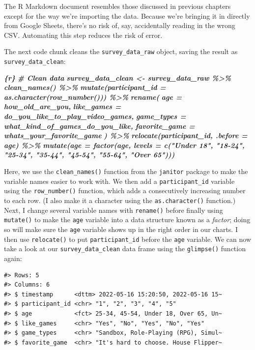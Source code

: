 \documentclass[
]{book}
\newenvironment{Shaded}{\begin{snugshade}}{\end{snugshade}}
\newcommand{\InformationTok}[1]{\textcolor[rgb]{0.56,0.35,0.01}{\textbf{\textit{#1}}}}
\begin{document}
The R Markdown document resembles those discussed in previous chapters except for the way we're importing the data. Because we're bringing it in directly from Google Sheets, there's no risk of, say, accidentally reading in the wrong CSV. Automating this step reduces the risk of error.

The next code chunk cleans the \texttt{survey\_data\_raw} object, saving the result as \texttt{survey\_data\_clean}:

\begin{Shaded}
\begin{Highlighting}[]
\InformationTok{\textasciigrave{}\textasciigrave{}\textasciigrave{}\{r\}}
\InformationTok{\# Clean data}
\InformationTok{survey\_data\_clean \textless{}{-} survey\_data\_raw \%\textgreater{}\%}
\InformationTok{  clean\_names() \%\textgreater{}\%}
\InformationTok{  mutate(participant\_id = as.character(row\_number())) \%\textgreater{}\%}
\InformationTok{  rename(}
\InformationTok{    age = how\_old\_are\_you,}
\InformationTok{    like\_games = do\_you\_like\_to\_play\_video\_games,}
\InformationTok{    game\_types = what\_kind\_of\_games\_do\_you\_like,}
\InformationTok{    favorite\_game = whats\_your\_favorite\_game}
\InformationTok{  ) \%\textgreater{}\%}
\InformationTok{  relocate(participant\_id, .before = age) \%\textgreater{}\%}
\InformationTok{  mutate(age = factor(age, levels = c("Under 18", "18{-}24", "25{-}34", "35{-}44", "45{-}54", "55{-}64", "Over 65")))}
\InformationTok{\textasciigrave{}\textasciigrave{}\textasciigrave{}}
\end{Highlighting}
\end{Shaded}

Here, we use the \texttt{clean\_names()} function from the \texttt{janitor} package to make the variable names easier to work with. We then add a \texttt{participant\_id} variable using the \texttt{row\_number()} function, which adds a consecutively increasing number to each row. (I also make it a character using the \texttt{as.character()} function.) Next, I change several variable names with \texttt{rename()} before finally using \texttt{mutate()} to make the \texttt{age} variable into a data structure known as a \emph{factor}; doing so will make sure the \texttt{age} variable shows up in the right order in our charts. I then use \texttt{relocate()} to put \texttt{participant\_id} before the \texttt{age} variable. We can now take a look at our \texttt{survey\_data\_clean} data frame using the \texttt{glimpse()} function again:

\begin{verbatim}
#> Rows: 5
#> Columns: 6
#> $ timestamp      <dttm> 2022-05-16 15:20:50, 2022-05-16 15~
#> $ participant_id <chr> "1", "2", "3", "4", "5"
#> $ age            <fct> 25-34, 45-54, Under 18, Over 65, Un~
#> $ like_games     <chr> "Yes", "No", "Yes", "No", "Yes"
#> $ game_types     <chr> "Sandbox, Role-Playing (RPG), Simul~
#> $ favorite_game  <chr> "It's hard to choose. House Flipper~
\end{verbatim}
\end{document}
